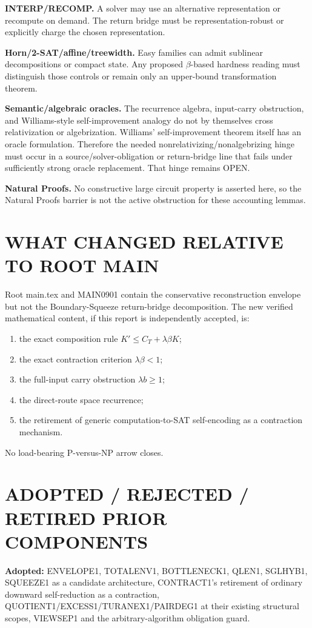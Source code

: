\documentclass[11pt]{article}
\begin{document}
\textbf{INTERP/RECOMP.} A solver may use an alternative representation or recompute on demand. The return bridge must be representation-robust or explicitly charge the chosen representation.

\textbf{Horn/2-SAT/affine/treewidth.} Easy families can admit sublinear decompositions or compact state. Any proposed \(\beta\)-based hardness reading must distinguish those controls or remain only an upper-bound transformation theorem.

\textbf{Semantic/algebraic oracles.} The recurrence algebra, input-carry obstruction, and Williams-style self-improvement analogy do not by themselves cross relativization or algebrization. Williams' self-improvement theorem itself has an oracle formulation. Therefore the needed nonrelativizing/nonalgebrizing hinge must occur in a source/solver-obligation or return-bridge line that fails under sufficiently strong oracle replacement. That hinge remains OPEN.

\textbf{Natural Proofs.} No constructive large circuit property is asserted here, so the Natural Proofs barrier is not the active obstruction for these accounting lemmas.

\section*{WHAT CHANGED RELATIVE TO ROOT MAIN}
Root main.tex and MAIN0901 contain the conservative reconstruction envelope but not the Boundary-Squeeze return-bridge decomposition. The new verified mathematical content, if this report is independently accepted, is:
\begin{enumerate}
\item the exact composition rule \(K'\le C_T+\lambda\beta K\);
\item the exact contraction criterion \(\lambda\beta<1\);
\item the full-input carry obstruction \(\lambda b\ge1\);
\item the direct-route space recurrence;
\item the retirement of generic computation-to-SAT self-encoding as a contraction mechanism.
\end{enumerate}
No load-bearing P-versus-NP arrow closes.

\section*{ADOPTED / REJECTED / RETIRED PRIOR COMPONENTS}
\textbf{Adopted:} ENVELOPE1, TOTALENV1, BOTTLENECK1, QLEN1, SGLHYB1, SQUEEZE1 as a candidate architecture, CONTRACT1's retirement of ordinary downward self-reduction as a contraction, QUOTIENT1/EXCESS1/TURANEX1/PAIRDEG1 at their existing structural scopes, VIEWSEP1 and the arbitrary-algorithm obligation guard.
\end{document}
